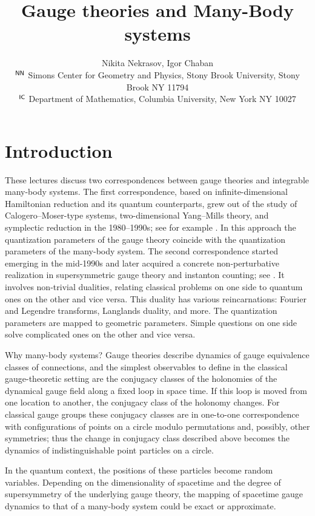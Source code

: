 \documentclass[12pt]{article}
\title{Gauge theories and  Many-Body systems}
\author{Nikita Nekrasov, Igor Chaban\\
{\small
$^{\sf NN}$ Simons Center for Geometry and Physics, Stony Brook University, Stony Brook NY 11794}\\
{\small
$^{\sf IC}$ Department of Mathematics, Columbia University, New York NY 10027
}}
\date{\vspace{-5ex}}
\numberwithin{equation}{section}
\theoremstyle{definition}
\begin{document}
\maketitle
\tableofcontents
\newpage
\section{Introduction}

These lectures discuss two correspondences between gauge theories and integrable many-body systems. 
The first correspondence, based on infinite-dimensional Hamiltonian reduction and its quantum counterparts, grew out of the study of Calogero--Moser-type systems, two-dimensional Yang--Mills theory, and symplectic reduction in the 1980--1990s; see for example \cite{Calogero1971,Sutherland1971,Migdal:1975,Meyer1973,MARSDEN1974121,KKS78}. In this approach the quantization parameters of the gauge theory coincide with the quantization parameters of the many-body system. 
The second correspondence started emerging in the mid-1990s and later acquired a concrete non-perturbative realization in supersymmetric gauge theory and instanton counting; see \cite{Nekrasov:2002qd,Nekrasov2015BPSCFTCN}. It involves non-trivial dualities, relating classical problems on one side to quantum ones on the other and vice versa. This duality has various reincarnations: Fourier and Legendre transforms, Langlands duality, and more. The quantization parameters are mapped to geometric parameters. Simple questions on one side solve complicated ones on the other and vice versa. 

Why many-body systems? Gauge theories describe dynamics of gauge equivalence classes of connections, and the simplest observables to define in the classical gauge-theoretic setting 
are the conjugacy classes of the holonomies of the dynamical gauge field along a fixed loop in space time. If this loop is moved from one location to another, the conjugacy class of the holonomy changes. For classical gauge groups these conjugacy classes are in one-to-one correspondence with configurations of points on a circle modulo permutations and, possibly, other symmetries; thus the change in conjugacy class described above becomes the dynamics of indistinguishable point particles on a circle. 

In the quantum context, the positions of these particles become random variables. Depending on the dimensionality of spacetime and the degree of supersymmetry of the underlying gauge theory, the mapping of spacetime gauge dynamics to that of a many-body system could be exact or approximate. 
\end{document}
